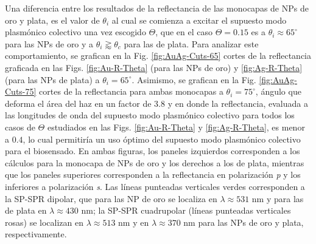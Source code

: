 Una diferencia entre los resultados de la reflectancia de las monocapas de NPs de oro y plata, es el valor de $\theta_i$ al cual se comienza a excitar el supuesto modo plasmónico colectivo una vez escogido $\Theta$, que en el caso  $\Theta=0.15$ es a $\theta_i\approx 65^\circ$ para las NPs de oro y a $\theta_i\gtrapprox\theta_c$ para las de plata. Para analizar este comportamiento, se grafican en la Fig. \ref{fig:AuAg-Cuts-65} cortes de la reflectancia graficada en las Figs. \ref{fig:Au-R-Theta} (para las NPs de oro) y \ref{fig:Ag-R-Theta} (para las NPs de plata) a $\theta_i=65^\circ$. Asimismo, se grafican en la Fig. \ref{fig:AuAg-Cuts-75} cortes de la reflectancia para ambas monocapas a $\theta_i=75^\circ$, ángulo que deforma el área del haz en un factor de $3.8$ y en donde  la reflectancia, evaluada a las longitudes de onda del supuesto modo plasmónico colectivo para todos los casos de $\Theta$ estudiados en las Figs.  \ref{fig:Au-R-Theta} y  \ref{fig:Ag-R-Theta}, es menor a $0.4$, lo cual permitiría un uso óptimo  del supuesto modo plasmónico colectivo para el biosensado. En ambas figuras, los paneles izquierdos corresponden a los cálculos para la monocapa de NPs de oro y los derechos a los de plata, mientras que los paneles superiores corresponden a la reflectancia en polarización \emph{p} y los inferiores a polarización \emph{s}. Las líneas punteadas verticales verdes corresponden a la SP-SPR dipolar,  que para las NP de oro se localiza en $\lambda\approx 531$ nm y para las de plata en $\lambda\approx 430$ nm; la SP-SPR cuadrupolar (líneas punteadas verticales rosas) se localizan en $\lambda\approx 513$ nm y en $ \lambda\approx 370$ nm para las NPs de oro y plata, respectivamente.

